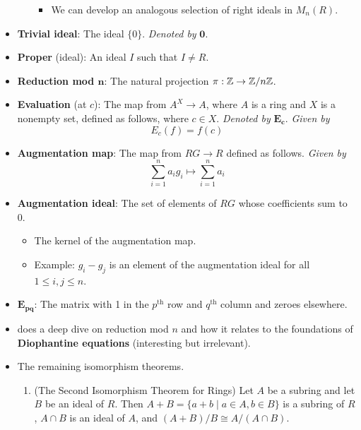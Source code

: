 \documentclass[../notes.tex]{subfiles}
\begin{document}
\begin{itemize}
\begin{enumerate}
\begin{itemize}
            \item We can develop an analogous selection of right ideals in $M_n(R)$.
        \end{itemize}
    \end{enumerate}
    \item \textbf{Trivial ideal}: The ideal $\{0\}$. \emph{Denoted by} $\bm{0}$.
    \item \textbf{Proper} (ideal): An ideal $I$ such that $I\neq R$.
    \item \textbf{Reduction mod $\bm{n}$}: The natural projection $\pi:\mathbb{Z}\to\mathbb{Z}/n\mathbb{Z}$.
    \item \textbf{Evaluation} (at $c$): The map from $A^X\to A$, where $A$ is a ring and $X$ is a nonempty set, defined as follows, where $c\in X$. \emph{Denoted by} $\bm{E_c}$. \emph{Given by}
    \begin{equation*}
        E_c(f) = f(c)
    \end{equation*}
    \item \textbf{Augmentation map}: The map from $RG\to R$ defined as follows. \emph{Given by}
    \begin{equation*}
        \sum_{i=1}^na_ig_i \mapsto \sum_{i=1}^na_i
    \end{equation*}
    \item \textbf{Augmentation ideal}: The set of elements of $RG$ whose coefficients sum to 0.
    \begin{itemize}
        \item The kernel of the augmentation map.
        \item Example: $g_i-g_j$ is an element of the augmentation ideal for all $1\leq i,j\leq n$.
    \end{itemize}
    \item $\bm{E_{pq}}$: The matrix with 1 in the $p^\text{th}$ row and $q^\text{th}$ column and zeroes elsewhere.
    \item {}\textcite{bib:DummitFoote} does a deep dive on reduction mod $n$ and how it relates to the foundations of \textbf{Diophantine equations} (interesting but irrelevant).
    \item The remaining isomorphism theorems.
    \begin{theorem}\label{trm:7.8}\leavevmode
        \begin{enumerate}
            \item (The Second Isomorphism Theorem for Rings) Let $A$ be a subring and let $B$ be an ideal of $R$. Then $A+B=\{a+b\mid a\in A,b\in B\}$ is a subring of $R$, $A\cap B$ is an ideal of $A$, and $(A+B)/B\cong A/(A\cap B)$.

\end{enumerate}
\end{theorem}
\end{itemize}
\end{document}
